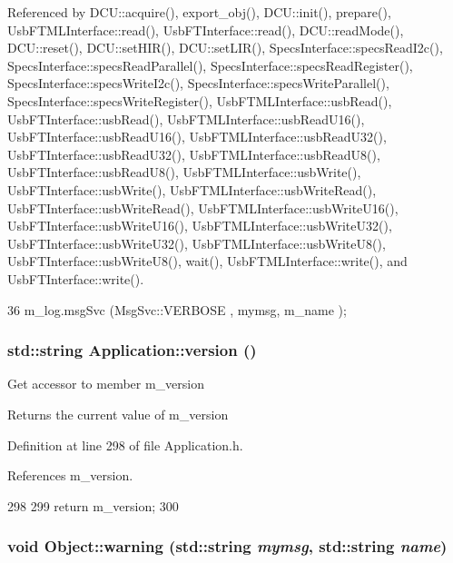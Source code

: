 Referenced by DCU::acquire(), export\_\-obj(), DCU::init(), prepare(), UsbFTMLInterface::read(), UsbFTInterface::read(), DCU::readMode(), DCU::reset(), DCU::setHIR(), DCU::setLIR(), SpecsInterface::specsReadI2c(), SpecsInterface::specsReadParallel(), SpecsInterface::specsReadRegister(), SpecsInterface::specsWriteI2c(), SpecsInterface::specsWriteParallel(), SpecsInterface::specsWriteRegister(), UsbFTMLInterface::usbRead(), UsbFTInterface::usbRead(), UsbFTMLInterface::usbReadU16(), UsbFTInterface::usbReadU16(), UsbFTMLInterface::usbReadU32(), UsbFTInterface::usbReadU32(), UsbFTMLInterface::usbReadU8(), UsbFTInterface::usbReadU8(), UsbFTMLInterface::usbWrite(), UsbFTInterface::usbWrite(), UsbFTMLInterface::usbWriteRead(), UsbFTInterface::usbWriteRead(), UsbFTMLInterface::usbWriteU16(), UsbFTInterface::usbWriteU16(), UsbFTMLInterface::usbWriteU32(), UsbFTInterface::usbWriteU32(), UsbFTMLInterface::usbWriteU8(), UsbFTInterface::usbWriteU8(), wait(), UsbFTMLInterface::write(), and UsbFTInterface::write().


\begin{DoxyCode}
36 { m_log.msgSvc (MsgSvc::VERBOSE , mymsg, m_name ); }
\end{DoxyCode}
\hypertarget{classApplication_a060ac7b6d3a6cb111a9ed39bfd0350d1}{
\subsubsection[{version}]{\setlength{\rightskip}{0pt plus 5cm}std::string Application::version ()}}
\label{classApplication_a060ac7b6d3a6cb111a9ed39bfd0350d1}
Get accessor to member m\_\-version \begin{DoxyReturn}{Returns}
the current value of m\_\-version 
\end{DoxyReturn}


Definition at line 298 of file Application.h.

References m\_\-version.


\begin{DoxyCode}
298                        {
299     return m_version;
300   }
\end{DoxyCode}
\hypertarget{classObject_a11f101db4dd73d9391b0231818881d86}{
\subsubsection[{warning}]{\setlength{\rightskip}{0pt plus 5cm}void Object::warning (std::string {\em mymsg}, \/  std::string {\em name})}}
\label{classObject_a11f101db4dd73d9391b0231818881d86}



